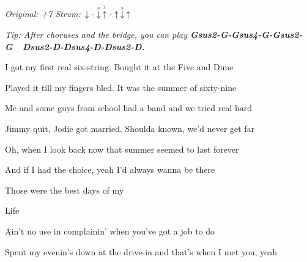 \begin{song}


\begin{headerbox}
\RaiseBoxWithAccents
\textit{Original: +7} \quad
\textit{Strum:} $\Down\Miss\ChuckDown\AccentUp\Miss\Up\ChuckDown\Up$
\end{headerbox}

\begin{hchordbox}
\end{hchordbox}

\large

\bigskip

\textit{\smaller
Tip: After choruses and the bridge, you can play \textbf{Gsus2-G-Gsus4-G-Gsus2-G\ \ Dsus2-D-Dsus4-D-Dsus2-D.}
}

\medskip

\bigskip

 I got my first real six-string.  Bought it at the Five and Dime \par
{} Played it till my fingers bled.  It was the summer of sixty-nine \par

\bigskip

 Me and some guys from school  had a band and we tried real hard \par
{} Jimmy quit, Jodie got married.  Shoulda known, we’d never get far \par

\bigskip

 Oh, when I look back now  that summer seemed to last forever \par
{} And if I had the choice,  yeah I’d always wanna be there \par
{} Those were the best days of my \par
{}Life    \par

\bigskip

 Ain’t no use in complainin’  when you’ve got a job to do \par
{} Spent my evenin’s down at the drive-in  and that’s when I met you, yeah \par


\end{song}
